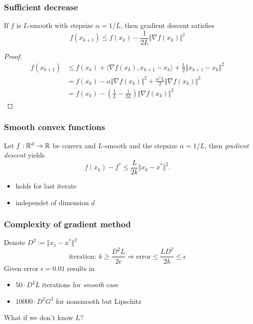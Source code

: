 \documentclass{beamer}
\begin{document}
\begin{frame}
  \frametitle{Sufficient decrease}
  \begin{lemma}%
    If $f$ is $L$-smooth with stepsize $\alpha = 1/L$, then gradient descent satisfies
    \begin{equation}
      f(x_{k+1}) \le f(x_k) - \frac{1}{2L} \Vert \nabla f(x_k) \Vert^2
    \end{equation}
  \end{lemma}
  \begin{proof}
    \begin{equation}
      \begin{aligned}
        f(x_{k+1}) &\le f(x_k) + \langle \nabla f(x_k), x_{k+1}-x_k \rangle + \frac{L}{2}\Vert x_{k+1}-x_k \Vert^2 \\
        &= f(x_k) - \alpha \Vert \nabla f(x_k) \Vert^2 + \frac{\alpha^2 L}{2} \Vert \nabla f(x_k) \Vert^2 \\
        &= f(x_k) - \left(\frac{1}{L} - \frac{1}{2L}\right) \Vert \nabla f(x_k) \Vert^2
      \end{aligned}
    \end{equation}
  \end{proof}
\end{frame}


\begin{frame}
  \frametitle{Smooth convex functions}
  \begin{theorem}
    Let $f: \mathbb{R}^d \to \mathbb{R}$ be convex and $L$-smooth and the stepsize $\alpha=1/L$, then
    \emph{gradient descent} yields
    \begin{equation}
      f(x_k)-f^* \le \frac{L}{2k}\Vert x_0-x^* \Vert^2.
    \end{equation}
  \end{theorem}
  \begin{itemize}
    \item holds for last iterate
    \item independet of dimension $d$
  \end{itemize}
\end{frame}

\begin{frame}
  \frametitle{Complexity of gradient method}
  Denote $D^2 := \Vert x_1- x^* \Vert^2$
  \begin{equation}
    \text{iteration: } k \ge \frac{D^2 L}{2 \epsilon} \Rightarrow \text{error} \le \frac{L D^2}{2 k} \le \epsilon
  \end{equation}
  Given error $\epsilon=0.01$ results in
  \begin{itemize}
    \item $50 \cdot D^2 L$ iterations for \textit{smooth} case
      \item $10 000 \cdot D^2 G^2$ for nonsmooth but Lipschitz
  \end{itemize}

  What if we don't know $L$?
\end{frame}
\end{document}
